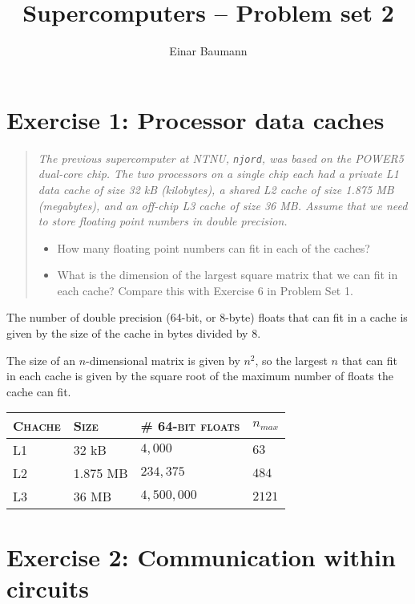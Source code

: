 


\title{Supercomputers -- Problem set 2}
\author{Einar Baumann}
\maketitle

\section{Exercise 1: Processor data caches} %
\label{sec:exercise_1}
\begin{quotation}{\itshape
  The previous supercomputer at NTNU, \texttt{njord}, was based on the POWER5 dual-core chip. The two processors on a single chip each had a private L1 data cache of size 32 kB (kilobytes), a shared L2 cache of size 1.875 MB (megabytes), and an off-chip L3 cache of size 36 MB. Assume that we need to store floating point numbers in double precision. 

  \begin{itemize}
    \item How many floating point numbers can fit in each of the caches?
    \item What is the dimension of the largest square matrix that we can fit in each cache? Compare this with Exercise 6  in Problem Set 1.
  \end{itemize}
}\end{quotation}

The number of double precision (64-bit, or 8-byte) floats that can fit in a cache is given by the size of the cache in bytes divided by 8.

The size of an $n$-dimensional matrix is given by $n^2$, so the largest $n$ that can fit in each cache is given by the square root of the maximum number of floats the cache can fit.

\begin{center}
  \begin{tabular}{llll}
  \toprule 
  \textsc{Chache} & \textsc{Size} & \# \textsc{64-bit floats} & $n_{max}$  \\
  \midrule
  L1 & 32 kB    & $4,000$     & $63$ \\
  L2 & 1.875 MB & $234,375$   & $484$ \\
  L3 & 36 MB    & $4,500,000$ & $2121$ \\
  \bottomrule
  \end{tabular}
\end{center}


\section{Exercise 2: Communication within circuits} %
\label{sec:exercise_2}



